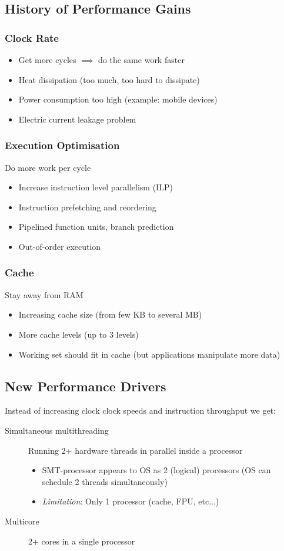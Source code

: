 \subsection{History of Performance Gains}
\subsubsection{Clock Rate}
\begin{itemize}
	\item Get more cycles $\implies$ do the same work faster
	\item Heat dissipation (too much, too hard to dissipate)
	\item Power consumption too high (example: mobile devices)
	\item Electric current leakage problem
\end{itemize}

\subsubsection{Execution Optimisation}
Do more work per cycle
\begin{itemize}
	\item Increase instruction level parallelism (ILP)
	\item Instruction prefetching and reordering
	\item Pipelined function units, branch prediction
	\item Out-of-order execution
\end{itemize}
\subsubsection{Cache}
Stay away from RAM
\begin{itemize}
	\item Increasing cache size (from few KB to several MB)
	\item More cache levels (up to 3 levels)
	\item Working set should fit in cache (but applications manipulate more data)
\end{itemize}

\subsection{New Performance Drivers}
Instead of increasing clock clock speeds and instruction throughput we get:
\begin{description}
	\item[Simultaneous multithreading] Running 2+ hardware threads in parallel inside a processor
		\begin{itemize}
			\item SMT-processor appears to OS as 2 (logical) processors (OS can schedule 2 threads simultaneously)
			\item \emph{Limitation}: Only 1 processor (cache, FPU, etc...)
		\end{itemize}
	\item[Multicore] 2+ cores in a single processor
\end{description}


